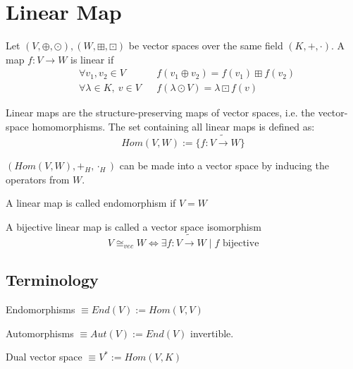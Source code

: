 \documentclass[root.tex]{subfiles}
\begin{document}
  \section{Linear Map}
  \begin{mydef}
    Let $(V,\oplus,\odot),(W,\boxplus,\boxdot)$ be vector spaces over the same field $(K, +,\cdot)$. A map $f : V \rightarrow W$ is linear if
    \begin{align*}
      & \forall v_1, v_2 \in V && f(v_1 \oplus v_2) = f(v_1) \boxplus f(v_2)\\
      & \forall \lambda \in K,\ v\in V && f(\lambda \odot V) = \lambda \boxdot f(v)
    \end{align*}
  \end{mydef}
  \begin{mydef}
    Linear maps are the structure-preserving maps of vector spaces, i.e. the vector-space homomorphisms. The set containing all linear maps is defined as:
    $$
    Hom(V,W) := \{ f : V \tilde{\longrightarrow} W\}
    $$
  \end{mydef}
  \begin{mydef}
    $(Hom(V,W), +_H, \cdot_H)$ can be made into a vector space by inducing the operators from $W$.
  \end{mydef}
  \begin{mydef}
    A linear map is called endomorphism if $V=W$
  \end{mydef}
  \begin{mydef}
    A bijective linear map is called a vector space isomorphism
    $$
    V \cong_{vec} W \Leftrightarrow \exists f : V \tilde{\longrightarrow} W \mid f \text{ bijective}
    $$
  \end{mydef}
  \subsection*{Terminology}
  \begin{mydef}
    Endomorphisms $\equiv End(V) := Hom(V,V)$
  \end{mydef}
  \begin{mydef}
    Automorphisms $\equiv Aut(V) := End(V)$ invertible.
  \end{mydef}
  \begin{mydef}
    Dual vector space $\equiv V^* := Hom(V,K)$
  \end{mydef}
\end{document}
